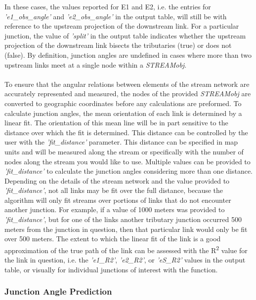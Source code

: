 \noindent In these cases, the values reported for E1 and E2, i.e. the entries for \textit{'e1\_obs\_angle'} and \textit{'e2\_obs\_angle'} in the output table, will still be with reference to the upstream projection of the downstream link. For a particular junction, the value of \textit{'split'} in the output table indicates whether the upstream projection of the downstream link bisects the tributaries (true) or does not (false). By definition, junction angles are undefined in cases where more than two upstream links meet at a single node within a \textit{STREAMobj}.   

\paragraph{}To ensure that the angular relations between elements of the stream network are accurately represented and measured, the nodes of the provided \textit{STREAMobj} are converted to geographic coordinates before any calculations are preformed. To calculate junction angles, the mean orientation of each link is determined by a linear fit. The orientation of this mean line will be in part sensitive to the distance over which the fit is determined. This distance can be controlled by the user with the \textit{'fit\_distance'} parameter. This distance can be specified in map units and will be measured along the stream or specifically with the number of nodes along the stream you would like to use. Multiple values can be provided to \textit{'fit\_distance'} to calculate the junction angles considering more than one distance. Depending on the details of the stream network and the value provided to \textit{'fit\_distance'}, not all links may be fit over the full distance, because the algorithm will only fit streams over portions of links that do not encounter another junction. For example, if a value of 1000 meters was provided to \textit{'fit\_distance'}, but for one of the links another tributary junction occurred 500 meters from the junction in question, then that particular link would only be fit over 500 meters. The extent to which the linear fit of the link is a good approximation of the true path of the link can be assessed with the R\textsuperscript{2} value for the link in question, i.e. the \textit{'e1\_R2'}, \textit{'e2\_R2'}, or \textit{'eS\_R2'} values in the output table, or visually for individual junctions of interest with the  function.

\subsubsection{Junction Angle Prediction}
